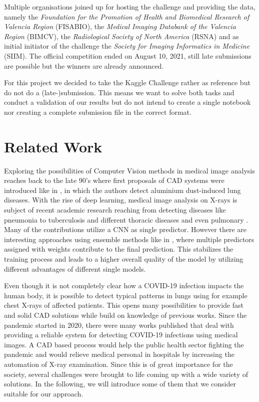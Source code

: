 Multiple organisations joined up for hosting the challenge and providing the data, namely the \textit{Foundation for the Promotion of Health and Biomedical Research of Valencia Region} (FISABIO), the \textit{Medical Imaging Databank of the Valencia Region} (BIMCV), the \textit{Radiological Society of North America} (RSNA) and as initial initiator of the challenge the \textit{Society for Imaging Informatics in Medicine} (SIIM). The official competition ended on August 10, 2021, still late submissions are possible but the winners are already announced.

For this project we decided to take the Kaggle Challenge rather as reference but do not do a (late-)submission. This means we want to solve both tasks and conduct a validation of our results but do not intend to create a single notebook nor creating a complete submission file in the correct format. 


\section{Related Work}
Exploring the possibilities of Computer Vision methods in medical image analysis reaches back to the late 90's where first proposals of \ac{CAD} systems were  introduced like in \autocite{kraus2000aluminium}, in which the authors detect aluminium dust-induced lung diseases.
With the rise of deep learning, medical image analysis on X-rays is subject of recent academic research reaching from detecting diseases like pneumonia \autocite{pneumoniaDetection} \autocite{pneumoniaDetection2} \autocite{gupta2019evolutionary} to tuberculosis and different thoracic diseases \autocite{jangam2021deep} and even pulmonary \autocite{vieira2021detecting}. Many of the contributions utilize a \ac{CNN} as single predictor. However there are interesting approaches using ensemble methods like in \autocite{livieris2019weighted}, where multiple predictors assigned with weights contribute to the final prediction. This stabilizes the training process and leads to a higher overall quality of the model by utilizing different advantages of different single models.

Even though it is not completely clear how a COVID-19 infection impacts the human body, it is possible to detect typical patterns in lungs using for example chest X-rays of affected patients. This opens many possibilities to provide fast and solid \ac{CAD} solutions while build on knowledge of previous works.
Since the pandemic started in 2020, there were many works published that deal with providing a reliable system for detecting COVID-19 infections using medical images. A \ac{CAD} based process would help the public health sector fighting the pandemic and would relieve medical personal in hospitals by increasing the automation of X-ray examination. Since this is of great importance for the society, several challenges were brought to life coming up with a wide variety of solutions. In the following, we will introduce some of them that we consider suitable for our approach.

